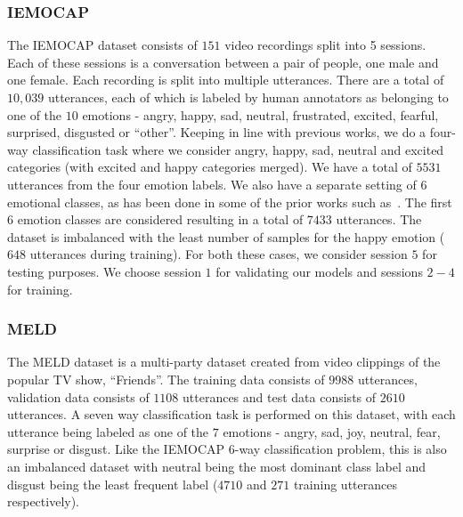 \documentclass[lettersize,journal]{IEEEtran}
\begin{document}
\subsubsection{IEMOCAP}
The IEMOCAP dataset consists of $151$ video recordings split into 5 sessions. Each of these sessions is a conversation between a pair of people, one male and one female. Each recording is split into multiple utterances. There are a total of $10,039$  utterances, each of which is labeled by human annotators as belonging to one of the $10$ emotions -  angry, happy, sad, neutral, frustrated, excited, fearful, surprised, disgusted or ``other''. Keeping in line with previous works, we do a four-way classification task where we consider angry, happy, sad, neutral and excited categories (with excited and happy categories merged). We have a total of $5531$ utterances from the four emotion labels. We also have a separate setting of $6$ emotional classes,  as has been done in some of the prior works such as~\cite{majumder2019dialoguernn}. The first $6$ emotion classes are considered resulting in a total of $7433$ utterances. The dataset is imbalanced with the least number of samples for the happy emotion ($648$ utterances during training). For both these cases, we consider session $5$ for testing purposes. We choose session $1$ for validating our models and sessions $2-4$ for training.

\subsubsection{MELD}
The MELD dataset is a multi-party dataset created from video clippings of the popular TV show, ``Friends''. The training data consists of $9988$ utterances, validation data consists of $1108$ utterances and  test data consists of $2610$ utterances.
A seven way classification task is performed on this dataset, with each utterance being labeled as one of the $7$ emotions - angry, sad, joy, neutral, fear, surprise or disgust. Like the IEMOCAP 6-way classification problem, this is also an imbalanced dataset with neutral being the most dominant class label and disgust being the least frequent label ($4710$ and $271$ training utterances respectively).
\end{document}
